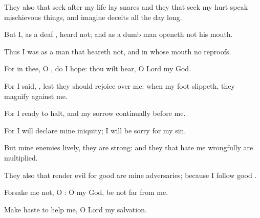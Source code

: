 {\Q {}They also that
seek after my
life lay
snares
{} and they that
seek my
hurt
speak mischievous
things, and
imagine
deceits all the
day long.


\par }{\Q {}But I, as a
deaf
{},
heard not; and
{} as a dumb
man
{}
openeth not his
mouth.


\par }{\Q {}Thus I was as a
man that
heareth not, and in whose
mouth
{} no
reproofs.


\par }{\Q {}For in thee, O
{}, do I
hope: thou wilt
hear, O
Lord my
God.


\par }{\Q {}For I
said,
{}, lest
{} they should
rejoice over me: when my
foot
slippeth, they
magnify
{} against me.


\par }{\Q {}For I
{}
ready to
halt, and my
sorrow
{}
continually before me.


\par }{\Q {}For I will
declare mine
iniquity; I will be
sorry for my
sin.


\par }{\Q {}But mine
enemies
{}
lively,
{} they are
strong: and they that
hate me
wrongfully are
multiplied.


\par }{\Q {}They also that
render
evil for
good are mine
adversaries; because I
follow
{}
good
{}.


\par }{\Q {}Forsake me not, O
{}: O my
God, be not
far from me.


\par }{\Q {}Make
haste to
help me, O
Lord my
salvation.




\par }
